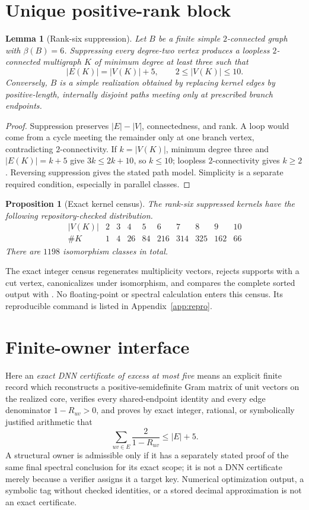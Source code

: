 \documentclass[11pt]{article}
\newtheorem{lemma}[theorem]{Lemma}
\newtheorem{proposition}[theorem]{Proposition}
\theoremstyle{definition}
\theoremstyle{remark}
\newcommand{\betarank}{\beta}
\begin{document}
\section{Unique positive-rank block}

\begin{lemma}[Rank-six suppression]\label{lem:suppression}
Let $B$ be a finite simple $2$-connected graph with $\betarank(B)=6$.
Suppressing every degree-two vertex produces a loopless $2$-connected
multigraph $K$ of minimum degree at least three such that
\[
 |E(K)|=|V(K)|+5,
 \qquad 2\le|V(K)|\le10.
\]
Conversely, $B$ is a simple realization obtained by replacing kernel edges by
positive-length, internally disjoint paths meeting only at prescribed branch
endpoints.
\end{lemma}
\begin{proof}
Suppression preserves $|E|-|V|$, connectedness, and rank.  A loop would come
from a cycle meeting the remainder only at one branch vertex, contradicting
$2$-connectivity.  If $k=|V(K)|$, minimum degree three and
$|E(K)|=k+5$ give $3k\le2k+10$, so $k\le10$; loopless $2$-connectivity gives
$k\ge2$.  Reversing suppression gives the stated path model.  Simplicity is a
separate required condition, especially in parallel classes.
\end{proof}

\begin{proposition}[Exact kernel census]\label{prop:census}
The rank-six suppressed kernels have the following repository-checked
distribution.
\[
\begin{array}{c|rrrrrrrrr}
 |V(K)|&2&3&4&5&6&7&8&9&10\\ \hline
 \#K&1&4&26&84&216&314&325&162&66
\end{array}
\]
There are $1198$ isomorphism classes in total.
\end{proposition}

The exact integer census regenerates multiplicity vectors, rejects supports
with a cut vertex, canonicalizes under isomorphism, and compares the complete
sorted output with .  No
floating-point or spectral calculation enters this census.  Its reproducible
command is listed in Appendix~\ref{app:repro}.

\section{Finite-owner interface}

Here an \emph{exact DNN certificate of excess at most five} means an explicit
finite record which reconstructs a positive-semidefinite Gram matrix of unit
vectors on the realized core, verifies every shared-endpoint identity and every
edge denominator $1-R_{uv}>0$, and proves by exact integer, rational, or
symbolically justified arithmetic that
\[
 \sum_{uv\in E}\frac{2}{1-R_{uv}}\le |E|+5.
\]
A structural owner is admissible only if it has a separately stated proof of
the same final spectral conclusion for its exact scope; it is not a DNN
certificate merely because a verifier assigns it a target key.  Numerical
optimization output, a symbolic tag without checked identities, or a stored
decimal approximation is not an exact certificate.
\end{document}
